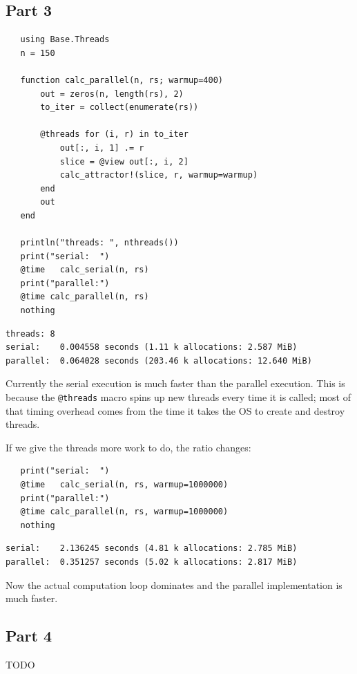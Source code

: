 \documentclass[nobib]{tufte-handout}
\begin{document}
\subsection{Part 3}
\label{sec:org066c82b}
\begin{verbatim}
   using Base.Threads
   n = 150

   function calc_parallel(n, rs; warmup=400)
       out = zeros(n, length(rs), 2)
       to_iter = collect(enumerate(rs))

       @threads for (i, r) in to_iter
           out[:, i, 1] .= r
           slice = @view out[:, i, 2]
           calc_attractor!(slice, r, warmup=warmup)
       end
       out
   end

   println("threads: ", nthreads())
   print("serial:  ")
   @time   calc_serial(n, rs)
   print("parallel:")
   @time calc_parallel(n, rs)
   nothing
\end{verbatim}

\begin{verbatim}
threads: 8
serial:    0.004558 seconds (1.11 k allocations: 2.587 MiB)
parallel:  0.064028 seconds (203.46 k allocations: 12.640 MiB)
\end{verbatim}


Currently the serial execution is much faster than the parallel execution. This is because the \texttt{@threads} macro spins up new threads
every time it is called; most of that timing overhead comes from the time it takes the OS to create and destroy threads.

If we give the threads more work to do, the ratio changes:

\begin{verbatim}
   print("serial:  ")
   @time   calc_serial(n, rs, warmup=1000000)
   print("parallel:")
   @time calc_parallel(n, rs, warmup=1000000)
   nothing
\end{verbatim}

\begin{verbatim}
serial:    2.136245 seconds (4.81 k allocations: 2.785 MiB)
parallel:  0.351257 seconds (5.02 k allocations: 2.817 MiB)
\end{verbatim}


Now the actual computation loop dominates and the parallel implementation is much faster.

\subsection{Part 4}
\label{sec:org875c7ae}
TODO
\end{document}
